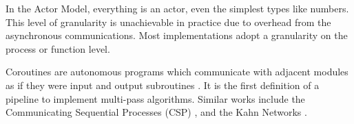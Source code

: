 In the Actor Model, everything is an actor, even the simplest types like numbers.
This level of granularity is unachievable in practice due to overhead from the asynchronous communications.
Most implementations adopt a granularity on the process or function level.

Coroutines are autonomous programs which communicate with adjacent modules as if they were input and output subroutines \cite{Conway1963}.
It is the first definition of a pipeline to implement multi-pass algorithms.
Similar works include the Communicating Sequential Processes (CSP) \cite{Hoare1978, Brookes1984}, and the Kahn Networks \cite{Kahn1974, Kahn1976}.






